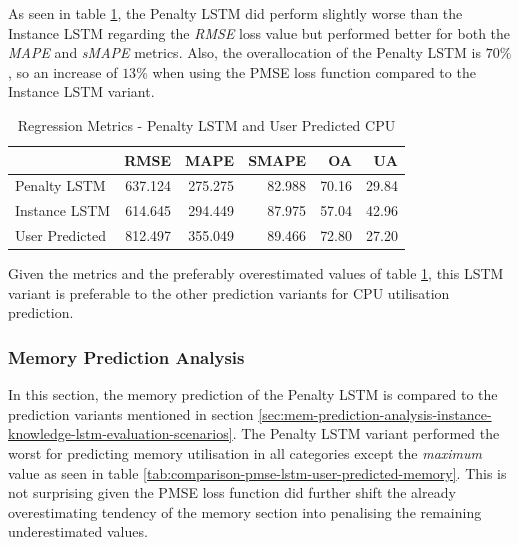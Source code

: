      As seen in table \ref{tab:regression-metrics-pmse-lstm-user-predicted-cpu}, the Penalty LSTM did perform slightly worse than the Instance LSTM regarding the \emph{RMSE} loss value but performed better for both the \emph{MAPE} and \emph{sMAPE} metrics.
      Also, the overallocation of the Penalty LSTM is $70 \%$, so an increase of $13 \%$ when using the PMSE loss function compared to the Instance LSTM variant.

      
      \begin{table}
        \centering
        \caption{Regression Metrics - Penalty LSTM and User Predicted CPU}
        \label{tab:regression-metrics-pmse-lstm-user-predicted-cpu}

        \begin{tabular}{|l|rrrrr|}
          \toprule
          {} &     RMSE &     MAPE &   SMAPE &     OA &     UA \\
          \midrule
          Penalty LSTM   &  637.124 &  275.275 &  82.988 &  70.16 &  29.84 \\
          Instance LSTM   &  614.645 &  294.449 &  87.975 &  57.04 &  42.96 \\
          User Predicted &  812.497 &  355.049 &  89.466 &  72.80 &  27.20 \\
          \bottomrule
        \end{tabular}
      \end{table}

      Given the metrics and the preferably overestimated values of table \ref{tab:regression-metrics-pmse-lstm-user-predicted-cpu}, this LSTM variant is preferable to the other prediction variants for CPU utilisation prediction.

    \subsubsection{Memory Prediction Analysis}
    \label{sec:mem-prediction-analysis-psme-lstm-evaluation}

      In this section, the memory prediction of the Penalty LSTM is compared to the prediction variants mentioned in section \ref{sec:mem-prediction-analysis-instance-knowledge-lstm-evaluation-scenarios}.
      The Penalty LSTM variant performed the worst for predicting memory utilisation in all categories except the \emph{maximum} value as seen in table \ref{tab:comparison-pmse-lstm-user-predicted-memory}.
      This is not surprising given the PMSE loss function did further shift the already overestimating tendency of the memory section into penalising the remaining underestimated values.
      

